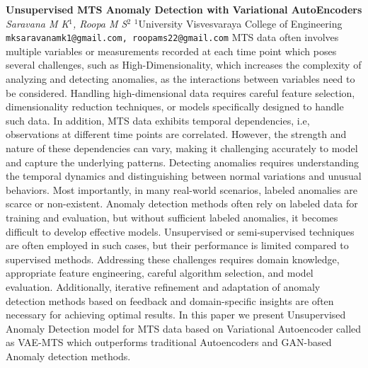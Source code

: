 
    \begin{conf-abstract}[]
        {\textbf{Unsupervised MTS Anomaly Detection with Variational AutoEncoders}}
        {\textit{Saravana  M K$^{1}$, Roopa M S$^{2}$}}
        {$^{1}$University Visvesvaraya College of Engineering}
        {\texttt{mksaravanamk1@gmail.com, roopams22@gmail.com}}
        {MTS data often involves multiple variables or measurements recorded at each time point which poses several challenges, such as High-Dimensionality, which increases the complexity of analyzing and detecting anomalies, as the interactions between variables need to be considered. Handling high-dimensional data requires careful feature selection, dimensionality reduction techniques, or models specifically designed to handle such data. In addition, MTS data exhibits temporal dependencies, i.e, observations at different time points are correlated. However, the strength and nature of these dependencies can vary, making it challenging accurately to model and capture the underlying patterns. Detecting anomalies requires understanding the temporal dynamics and distinguishing between normal variations and unusual behaviors. Most importantly, in many real-world scenarios, labeled anomalies are scarce or non-existent. Anomaly detection methods often rely on labeled data for training and evaluation, but without sufficient labeled anomalies, it becomes difficult to develop effective models. Unsupervised or semi-supervised techniques are often employed in such cases, but their performance is limited compared to supervised methods. Addressing these challenges requires domain knowledge, appropriate feature engineering, careful algorithm selection, and model evaluation. Additionally, iterative refinement and adaptation of anomaly detection methods based on feedback and domain-specific insights are often necessary for achieving optimal results. In this paper we present Unsupervised Anomaly Detection model for MTS data based on Variational Autoencoder called as VAE-MTS which outperforms traditional Autoencoders and GAN-based Anomaly detection methods.}
    \end{conf-abstract}
        